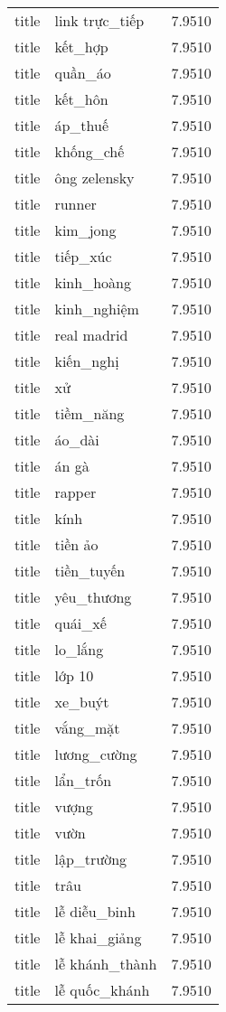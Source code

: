 \documentclass{article}
\begin{document}
\begin{tabular}{lll}
title & link trực\_tiếp & 7.9510\\
title & kết\_hợp & 7.9510\\
title & quần\_áo & 7.9510\\
title & kết\_hôn & 7.9510\\
title & áp\_thuế & 7.9510\\
title & khống\_chế & 7.9510\\
title & ông zelensky & 7.9510\\
title & runner & 7.9510\\
title & kim\_jong & 7.9510\\
title & tiếp\_xúc & 7.9510\\
title & kinh\_hoàng & 7.9510\\
title & kinh\_nghiệm & 7.9510\\
title & real madrid & 7.9510\\
title & kiến\_nghị & 7.9510\\
title & xử & 7.9510\\
title & tiềm\_năng & 7.9510\\
title & áo\_dài & 7.9510\\
title & án gà & 7.9510\\
title & rapper & 7.9510\\
title & kính & 7.9510\\
title & tiền ảo & 7.9510\\
title & tiền\_tuyến & 7.9510\\
title & yêu\_thương & 7.9510\\
title & quái\_xế & 7.9510\\
title & lo\_lắng & 7.9510\\
title & lớp 10 & 7.9510\\
title & xe\_buýt & 7.9510\\
title & vắng\_mặt & 7.9510\\
title & lương\_cường & 7.9510\\
title & lẩn\_trốn & 7.9510\\
title & vượng & 7.9510\\
title & vườn & 7.9510\\
title & lập\_trường & 7.9510\\
title & trâu & 7.9510\\
title & lễ diễu\_binh & 7.9510\\
title & lễ khai\_giảng & 7.9510\\
title & lễ khánh\_thành & 7.9510\\
title & lễ quốc\_khánh & 7.9510\\

\end{tabular}
\end{document}
